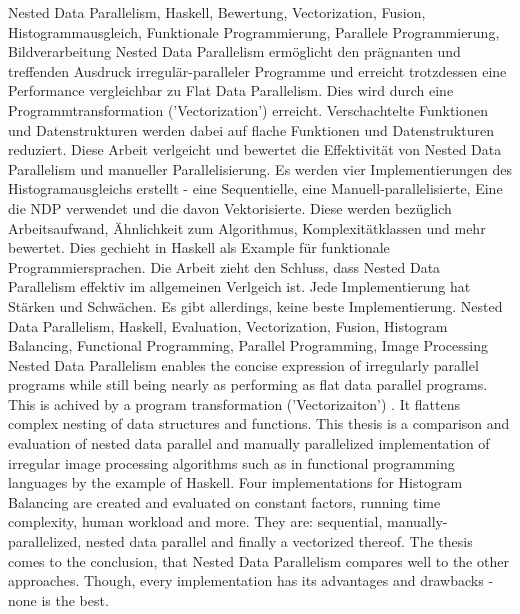 \documentclass[draft=false
              ,paper=a4
              ,twoside=false
              ,fontsize=11pt
              ,headsepline
              ,BCOR10mm
              ,DIV11
              ]{scrbook}
\newcommand{\algo}[0]{Histogram Balancing\xspace}
\begin{document}
\HAWAbstractPage
{Nested Data Parallelism, Haskell,
Bewertung, Vectorization, Fusion, Histogrammausgleich,
Funktionale Programmierung, Parallele Programmierung, Bildverarbeitung}%
{
Nested Data Parallelism
ermöglicht den prägnanten und treffenden
Ausdruck irregulär-paralleler Programme
und erreicht trotzdessen eine Performance
vergleichbar zu Flat Data Parallelism.
Dies wird durch eine Programmtransformation ('Vectorization')
erreicht. Verschachtelte Funktionen und Datenstrukturen
werden dabei auf flache Funktionen und Datenstrukturen reduziert.
Diese Arbeit verlgeicht und bewertet die Effektivität
von Nested Data Parallelism und manueller Parallelisierung.
Es werden vier Implementierungen des Histogramausgleichs erstellt - 
eine Sequentielle, eine Manuell-parallelisierte,
Eine die NDP verwendet und die davon Vektorisierte.
Diese werden bezüglich Arbeitsaufwand, Ähnlichkeit
zum Algorithmus, Komplexitätklassen und mehr bewertet.
Dies gechieht in Haskell als Example für funktionale Programmiersprachen.
Die Arbeit zieht den Schluss, dass Nested Data Parallelism
effektiv im allgemeinen Verlgeich ist.
Jede Implementierung hat Stärken und Schwächen. Es gibt
allerdings, keine beste Implementierung.}%
{Nested Data Parallelism, Haskell, Evaluation,
Vectorization, Fusion, Histogram Balancing,
Functional Programming, Parallel Programming,
Image Processing}%
{
Nested Data Parallelism enables
the concise expression of irregularly parallel programs
while still being nearly as performing as flat data parallel programs.
This is achived by a program transformation ('Vectorizaiton')
. It flattens complex nesting of data structures and functions.
This thesis is a comparison and evaluation of nested data parallel
and manually parallelized implementation
of irregular image processing algorithms such as \aglo
in functional programming languages by the example of Haskell.
Four implementations for \algo are created and evaluated on
constant factors, running time complexity, human workload and more. 
They are: sequential, manually-parallelized,
nested data parallel and finally a vectorized thereof.
The thesis comes to the conclusion, that Nested Data Parallelism
compares well to the other approaches.
Though, every implementation has its advantages and drawbacks -
none is the best.}

\newpage
\singlespacing

\tableofcontents
\newpage
\listoftables
\listoffigures
\end{document}
